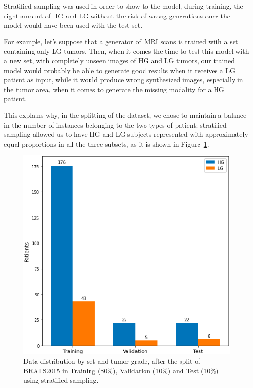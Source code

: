 Stratified sampling was used in order to show to the model, during training, the right amount of HG and LG without the risk of wrong generations once the model would have been used with the test set. 

\vspace{2mm} %
For example, let's suppose that a generator of~\ac{MRI} scans is trained with a set containing only LG tumors. Then, when it comes the time to test this model with a new set, with completely unseen images of HG and LG tumors, our trained model would probably be able to generate good results when it receives a LG patient as input, while it would produce wrong synthesized images, especially in the tumor area, when it comes to generate the missing modality for a HG patient.


This explains why, in the splitting of the dataset, we chose to maintain a balance in the number of instances belonging to the two types of patient: stratified sampling allowed us to have HG and LG subjects represented with approximately equal proportions in all the three subsets, as it is shown in Figure~\ref{fig:barplot_split}.

\begin{figure}[H]
\centering
\includegraphics[height=0.51\textheight]{images/barplot_split.pdf}
\caption[Data distribution by set and tumor grade]{Data distribution by set and tumor grade, after the split of BRATS2015 in Training (80\%), Validation (10\%) and Test (10\%) using stratified sampling.}
\label{fig:barplot_split}
\end{figure}


